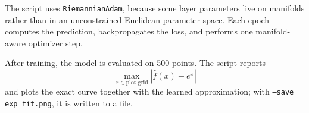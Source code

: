 \documentclass[10pt]{article}
\begin{document}
The script uses \texttt{RiemannianAdam}, because some layer parameters live on
manifolds rather than in an unconstrained Euclidean parameter space.  Each
epoch computes the prediction, backpropagates the loss, and performs one
manifold-aware optimizer step.

After training, the model is evaluated on 500 points.  The script reports
\begin{equation}
 \max_{x\in\text{plot grid}}|\widehat f(x)-e^x|
\end{equation}
and plots the exact curve together with the learned approximation; with
\texttt{--save exp\_fit.png}, it is written to a file.
\end{document}
